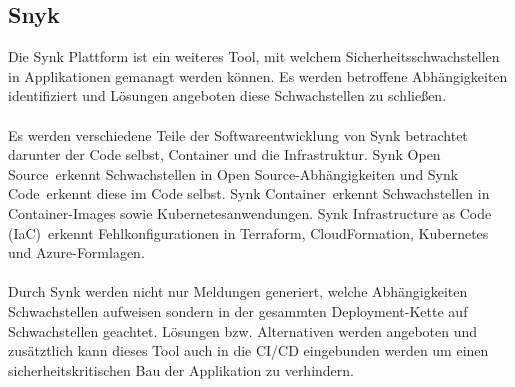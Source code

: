 \subsection{Snyk} \label{sec:Snyk}
Die Synk Plattform ist ein weiteres Tool, mit welchem Sicherheitsschwachstellen in Applikationen gemanagt werden können.
Es werden betroffene Abhängigkeiten identifiziert und Lösungen angeboten diese Schwachstellen zu schließen.
\\ \\
Es werden verschiedene Teile der Softwareentwicklung von Synk betrachtet darunter der Code selbst, Container und die Infrastruktur.
\glqq Synk Open Source\grqq~erkennt Schwachstellen in \glqq Open Source\grqq-Abhängigkeiten und \glqq Synk Code\grqq~erkennt diese im Code selbst.
\glqq Synk Container\grqq~erkennt Schwachstellen in Container-Images sowie Kubernetesanwendungen.
\glqq Synk Infrastructure as Code (IaC)\grqq~erkennt Fehlkonfigurationen in Terraform, CloudFormation, Kubernetes und Azure-Formlagen.
\\ \\
Durch Synk werden nicht nur Meldungen generiert, welche Abhängigkeiten Schwachstellen aufweisen sondern in der gesammten Deployment-Kette auf Schwachstellen geachtet.
Lösungen bzw. Alternativen werden angeboten und zusätztlich kann dieses Tool auch in die CI/CD eingebunden werden um einen sicherheitskritischen Bau der Applikation zu verhindern.   